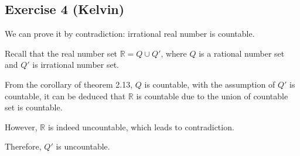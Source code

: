 \subsection*{Exercise 4 (Kelvin)}
We can prove it by contradiction: irrational real number is countable.

Recall that the real number set $\mathbb{R} = Q \cup Q'$, where $Q$ is a rational number set and $Q'$ is irrational number set.

From the corollary of theorem 2.13, $Q$ is countable, with the assumption of $Q'$ is countable, it can be deduced that $\mathbb{R}$ is countable due to the union of countable set is countable.

However, $\mathbb{R}$ is indeed uncountable, which leads to contradiction.

Therefore, $Q'$ is uncountable.
